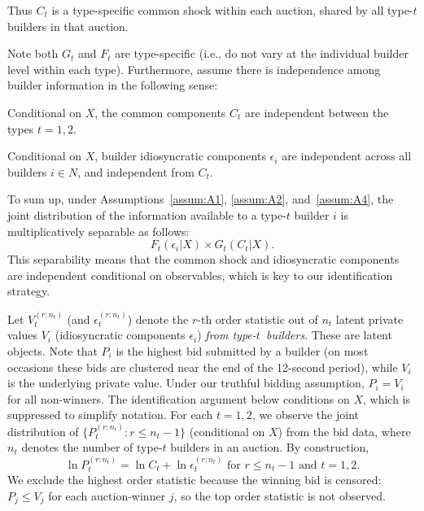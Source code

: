 \documentclass[12pt,reqno]{amsart}
\begin{document}
Thus $C_{t}$ is a type-specific common shock within each auction, shared by all type-$t$ builders in that auction.

Note both $G_{t}$ and $F_{t}$ are type-specific (i.e., do not vary at the individual builder level within each type). Furthermore, assume there is independence among builder information in the following sense:

\begin{assumption}\label{assum:A2}
Conditional on $X$, the common components $C_{t}$ are independent between the types $t=1,2$.
\end{assumption}

\begin{assumption}\label{assum:A4}
Conditional on $X$, builder idiosyncratic components $\epsilon _{i}$ are independent across all builders $i\in N$, and independent from $C_{t}$.

\end{assumption}

To sum up, under Assumptions~\ref{assum:A1}, \ref{assum:A2}, and~\ref{assum:A4}, the joint distribution of the information available to a type-$t$ builder $i$ is multiplicatively separable as follows:%
\begin{equation}
F_{t}(\epsilon _{i}|X)\times G_{t}(C_{t}|X)\text{.}  \label{A1}
\end{equation}
This separability means that the common shock and idiosyncratic components are independent conditional on observables, which is key to our identification strategy.

Let $V_{t}^{(r:n_{t})}$ (and $\epsilon _{t}^{(r:n_{t})}$) denote the $r$-th order statistic out of $n_{t}$ latent private values $V_{i}$ (idiosyncratic components $\epsilon _{i}$) \textit{from type-}$t$\textit{\ builders}. These are latent objects. Note that $P_{i}$ is the highest bid submitted by a builder (on most occasions these bids are clustered near the end of the 12-second period), while $V_{i}$ is the underlying private value. Under our truthful bidding assumption, $P_{i}=V_{i}$ for all non-winners.
The identification argument below conditions on $X$, which is suppressed to
simplify notation. For each $t=1,2$, we observe the joint distribution of $%
\{P_{t}^{(r:n_{t})}:r\leq n_{t}-1\}$ (conditional on $X$) from the bid data,
where $n_{t}$ denotes the number of type-$t$ builders in an auction. By
construction, 
\[
\ln P_{t}^{(r:n_{t})} = \ln C_{t}+\ln\epsilon _{t}^{(r:n_{t})}\text{ for }r\leq n_{t}-1%
\text{ and }t=1,2\text{.} 
\]
We exclude the highest order statistic because the winning bid is censored: $P_{j}\leq V_{j}$ for each auction-winner $j$, so the top order statistic is not observed.
\end{document}
